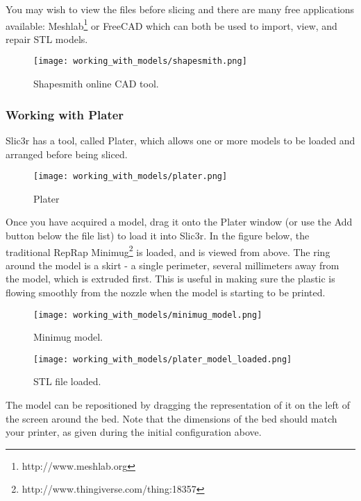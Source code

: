 You may wish to view the files before slicing and there are many free applications available: Meshlab\footnote{http://www.meshlab.org} or FreeCAD which can both be used to import, view, and repair STL models.

\begin{figure}[H]
\centering
\texttt{[image: working\_with\_models/shapesmith.png]}
\caption{Shapesmith online CAD tool.}
\label{fig:shapesmith}
\end{figure}



\subsubsection{Working with Plater} %
\label{sub:working_with_plater}
Slic3r has a tool, called Plater, which allows one or more models to be loaded and arranged before being sliced.

\begin{figure}[H]
\centering
\texttt{[image: working\_with\_models/plater.png]}
\caption{Plater}
\label{fig:plater}
\end{figure}

Once you have acquired a model, drag it onto the Plater window (or use the Add button below the file list) to load it into Slic3r.  In the figure below, the traditional RepRap Minimug\footnote{http://www.thingiverse.com/thing:18357} is loaded, and is viewed from above. The ring around the model is a skirt - a single perimeter, several millimeters away from the model, which is extruded first.  This is useful in making sure the plastic is flowing smoothly from the nozzle when the model is starting to be printed.

\begin{figure}[H]
\centering
\texttt{[image: working\_with\_models/minimug\_model.png]}
\caption{Minimug model.}
\label{fig:minimug_model}
\end{figure}

\begin{figure}[H]
\centering
\texttt{[image: working\_with\_models/plater\_model\_loaded.png]}
\caption{STL file loaded.}
\label{fig:plater_model_loaded}
\end{figure}

The model can be repositioned by dragging the representation of it on the left of the screen around the bed.  Note that the dimensions of the bed should match your printer, as given during the initial configuration above.

